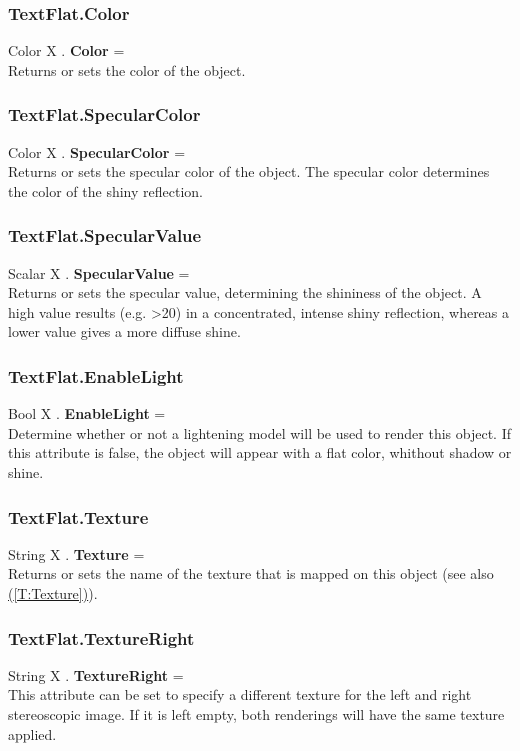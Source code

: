 \documentclass[10pt]{book}
\newcommand{\linkitem}[1]{\hyperref[#1]{\nameref{#1} (\ref{#1})}}
\begin{document}
\subsubsection{TextFlat.Color \label{F:TextFlat:Color}}
Color X . \textbf{Color} = \\
Returns or sets the color of the object.

\subsubsection{TextFlat.SpecularColor \label{F:TextFlat:SpecularColor}}
Color X . \textbf{SpecularColor} = \\
Returns or sets the specular color of the object. The specular color determines the color of the shiny reflection.

\subsubsection{TextFlat.SpecularValue \label{F:TextFlat:SpecularValue}}
Scalar X . \textbf{SpecularValue} = \\
Returns or sets the specular value, determining the shininess of the object. A high value results (e.g. >20) in a concentrated, intense shiny reflection, whereas a lower value gives a more diffuse shine.

\subsubsection{TextFlat.EnableLight \label{F:TextFlat:EnableLight}}
Bool X . \textbf{EnableLight} = \\
Determine whether or not a lightening model will be used to render this object. If this attribute is false, the object will appear with a flat color, whithout shadow or shine.

\subsubsection{TextFlat.Texture \label{F:TextFlat:Texture}}
String X . \textbf{Texture} = \\
Returns or sets the name of the texture that is mapped on this object (see also \linkitem{T:Texture}).

\subsubsection{TextFlat.TextureRight \label{F:TextFlat:TextureRight}}
String X . \textbf{TextureRight} = \\
This attribute can be set to specify a different texture for the left and right stereoscopic image. If it is left empty, both renderings will have the same texture applied.
\end{document}
